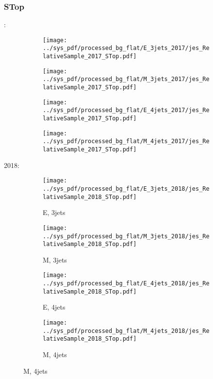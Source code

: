 \documentclass{beamer}
\begin{document}
\begin{frame}
\frametitle{STop}
\fontsize{5}{1}:
\begin{figure}
\centering
\begin{subfigure}[b]{0.24\textwidth}
\texttt{[image: ../sys\_pdf/processed\_bg\_flat/E\_3jets\_2017/jes\_RelativeSample\_2017\_STop.pdf]}
\end{subfigure}
\begin{subfigure}[b]{0.24\textwidth}
\texttt{[image: ../sys\_pdf/processed\_bg\_flat/M\_3jets\_2017/jes\_RelativeSample\_2017\_STop.pdf]}
\end{subfigure}
\begin{subfigure}[b]{0.24\textwidth}
\texttt{[image: ../sys\_pdf/processed\_bg\_flat/E\_4jets\_2017/jes\_RelativeSample\_2017\_STop.pdf]}
\end{subfigure}
\begin{subfigure}[b]{0.24\textwidth}
\texttt{[image: ../sys\_pdf/processed\_bg\_flat/M\_4jets\_2017/jes\_RelativeSample\_2017\_STop.pdf]}
\end{subfigure}
\end{figure}
2018:
\begin{figure}
\centering
\begin{subfigure}[b]{0.24\textwidth}
\texttt{[image: ../sys\_pdf/processed\_bg\_flat/E\_3jets\_2018/jes\_RelativeSample\_2018\_STop.pdf]}
\captionsetup{font=tiny}
\caption{E, 3jets}
\end{subfigure}
\begin{subfigure}[b]{0.24\textwidth}
\texttt{[image: ../sys\_pdf/processed\_bg\_flat/M\_3jets\_2018/jes\_RelativeSample\_2018\_STop.pdf]}
\captionsetup{font=tiny}
\caption{M, 3jets}
\end{subfigure}
\begin{subfigure}[b]{0.24\textwidth}
\texttt{[image: ../sys\_pdf/processed\_bg\_flat/E\_4jets\_2018/jes\_RelativeSample\_2018\_STop.pdf]}
\captionsetup{font=tiny}
\caption{E, 4jets}
\end{subfigure}
\begin{subfigure}[b]{0.24\textwidth}
\texttt{[image: ../sys\_pdf/processed\_bg\_flat/M\_4jets\_2018/jes\_RelativeSample\_2018\_STop.pdf]}
\captionsetup{font=tiny}
\caption{M, 4jets}
\end{subfigure}
\end{figure}
\end{frame}
\end{document}
